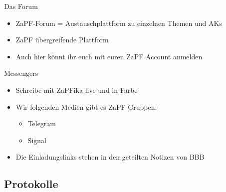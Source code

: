 \documentclass[compress,]{beamer}
\begin{document}
\begin{frame}{Das Forum}

\begin{itemize}[<+->]
	\item ZaPF-Forum = Austauschplattform zu einzelnen Themen und AKs
	\item ZaPF übergreifende Plattform
	\item Auch hier könnt ihr euch mit euren ZaPF Account anmelden

\end{itemize}

\end{frame}

\begin{frame}{Messengers}

\begin{itemize}[<+->]
	\item Schreibe mit ZaPFika live und in Farbe
	\item Wir folgenden Medien gibt es ZaPF Gruppen:
		\begin{itemize}
			\item Telegram
			\item Signal
		\end{itemize}
	\item Die Einladungslinks stehen in den geteilten Notizen von BBB	
\end{itemize}

\end{frame}


%
%



\subsection{Protokolle}
\end{document}
